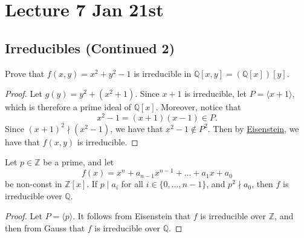 \documentclass[notoc,notitlepage,nobib]{tufte-book}
\begin{document}


\chapter{Lecture 7 Jan 21st}%
\label{chp:lecture_7_jan_21st}

\section{Irreducibles (Continued 2)}%
\label{sec:irreducibles_continued_2}

\begin{eg}
  Prove that $f(x, y) = x^2 + y^2 - 1$ is irreducible in $\mathbb{Q}[x, y] = (\mathbb{Q}[x])[y]$.
\end{eg}

\begin{proof}
  Let $g(y) = y^2 + (x^2 + 1)$. Since $x + 1$ is irreducible, let $P = \langle x + 1 \rangle$,
  which is therefore a prime ideal of $\mathbb{Q}[x]$. Moreover, notice that
  \begin{equation*}
    x^2 - 1 = ( x + 1 )( x - 1 ) \in P.
  \end{equation*}
  Since $(x + 1)^2 \nmid \left(x^2 - 1\right)$, we have that $x^2 - 1 \notin P^2$. Then by
  \hyperref[propo:eisenstein_s_criterion]{Eisenstein}, we have that $f(x, y)$ is irreducible.
\end{proof}

\begin{crly}\label{crly:eisenstein_gauss}
  Let $p \in \mathbb{Z}$ be a prime, and let
  \begin{equation*}
    f(x) = x^n + a_{n - 1} x^{n - 1} + \hdots + a_1 x + a_0
  \end{equation*}
  be non-const in $\mathbb{Z}[x]$. If $p \mid a_i$ for all $i \in \{0, \ldots, n - 1\}$, and
  $p^2 \nmid a_0$, then $f$ is irreducible over $\mathbb{Q}$.
\end{crly}


\begin{proof}
  Let $P = \langle p \rangle$. It follows from Eisenstein that $f$ is irreducible over $\mathbb{Z}$,
  and then from Gauss that $f$ is irreducible over $\mathbb{Q}$.
\end{proof}
\end{document}
